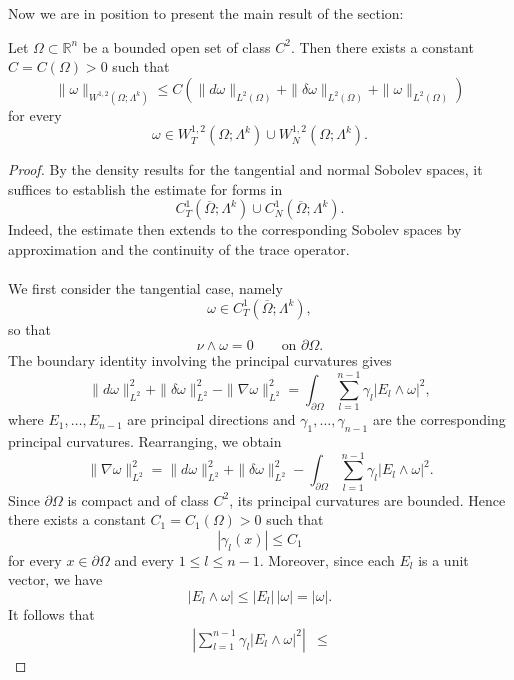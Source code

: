 Now we are in position to present the main result of the section:
\begin{theorem}
\label{thm:gaffney_inequality}
Let $\Omega\subset\mathbb{R}^n$ be a bounded open set of class $C^2$.
Then there exists a constant $C=C(\Omega)>0$ such that
\[
    \|\omega\|_{W^{1,2}(\Omega;\Lambda^k)}
    \leq
    C\left(
        \|d\omega\|_{L^2(\Omega)}
        +
        \|\delta\omega\|_{L^2(\Omega)}
        +
        \|\omega\|_{L^2(\Omega)}
    \right)
\]
for every
\[
    \omega\in
    W_T^{1,2}(\Omega;\Lambda^k)
    \cup
    W_N^{1,2}(\Omega;\Lambda^k).
\]
\end{theorem}

\begin{proof}
By the density results for the tangential and normal Sobolev spaces, it
suffices to establish the estimate for forms in
\[
    C_T^1(\overline{\Omega};\Lambda^k)
    \cup
    C_N^1(\overline{\Omega};\Lambda^k).
\]
Indeed, the estimate then extends to the corresponding Sobolev spaces by
approximation and the continuity of the trace operator.
\\\\ We first consider the tangential case, namely
\[
    \omega\in C_T^1(\overline{\Omega};\Lambda^k),
\]
so that
\[
    \nu\wedge\omega=0
    \qquad\text{on }\partial\Omega.
\]
The boundary identity involving the principal curvatures gives
\[
    \|d\omega\|_{L^2}^2
    +
    \|\delta\omega\|_{L^2}^2
    -
    \|\nabla\omega\|_{L^2}^2
    =
    \int_{\partial\Omega}
    \sum_{l=1}^{n-1}
    \gamma_l|E_l\wedge\omega|^2,
\]
where $E_1,\ldots,E_{n-1}$ are principal directions and
$\gamma_1,\ldots,\gamma_{n-1}$ are the corresponding principal
curvatures. Rearranging, we obtain
\begin{equation}
\label{eq:gaffney_start}
    \|\nabla\omega\|_{L^2}^2
    =
    \|d\omega\|_{L^2}^2
    +
    \|\delta\omega\|_{L^2}^2
    -
    \int_{\partial\Omega}
    \sum_{l=1}^{n-1}
    \gamma_l|E_l\wedge\omega|^2.
\end{equation}
Since $\partial\Omega$ is compact and of class $C^2$, its principal
curvatures are bounded. Hence there exists a constant
$C_1=C_1(\Omega)>0$ such that
\[
    |\gamma_l(x)|\leq C_1
\]
for every $x\in\partial\Omega$ and every $1\leq l\leq n-1$.
Moreover, since each $E_l$ is a unit vector, we have
\[
    |E_l\wedge\omega|
    \leq
    |E_l|\,|\omega|
    =
    |\omega|.
\]
It follows that
\[
\begin{aligned}
\left|
    \sum_{l=1}^{n-1}
    \gamma_l|E_l\wedge\omega|^2
\right|
&\leq

\end{aligned}\]
\end{proof}
